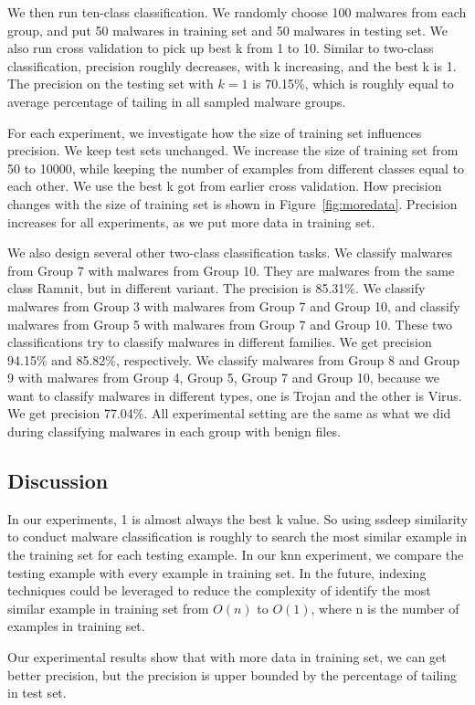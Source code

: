 We then run ten-class classification.
We randomly choose 100 malwares from each group, 
and put 50 malwares in training set and 50 malwares in testing set.
We also run cross validation to pick up best k from 1 to 10. 
Similar to two-class classification, precision roughly decreases, with k increasing, 
and the best k is 1. 
The precision on the testing set with $k = 1$ is 70.15\%, 
which is roughly equal to average percentage of tailing in all sampled malware groups. 

For each experiment, we investigate 
how the size of training set influences precision.
We keep test sets unchanged.  
We increase the size of training set from 50 to 10000, 
while keeping the number of examples from different classes equal to each other.  
We use the best k got from earlier cross validation.
How precision changes with the size of training set is shown in Figure~\ref{fig:moredata}. 
Precision increases for all experiments, as we put more data in training set.   

We also design several other two-class classification tasks. 
We classify malwares from Group 7 with malwares from Group 10. 
They are malwares from the same class Ramnit, but in different variant. 
The precision is 85.31\%. 
We classify malwares from Group 3 with malwares from Group 7 and Group 10, 
and classify malwares from Group 5 with malwares from Group 7 and Group 10. 
These two classifications try to classify malwares in different families. 
We get precision 94.15\% and 85.82\%, respectively. 
We classify malwares from Group 8 and Group 9 with malwares from Group 4, Group 5, Group 7 and Group 10, 
because we want to classify malwares in different types, one is Trojan and the other is Virus. We get precision 77.04\%. 
All experimental setting are the same as what we did during classifying malwares in each group with benign files. 

\subsection{Discussion}
In our experiments, 1 is almost always the best k value. 
So using ssdeep similarity to conduct malware classification 
is roughly to search the most similar example in the training set for each testing example.
In our knn experiment, we compare the testing example with every example in training set. 
In the future, indexing techniques could be leveraged to reduce the complexity of identify 
the most similar example in training set from $O(n)$ to $O(1)$, where n is the number of examples in training set. 

Our experimental results show that with more data in training set, 
we can get better precision, but the precision is upper bounded by the percentage of tailing in test set. 